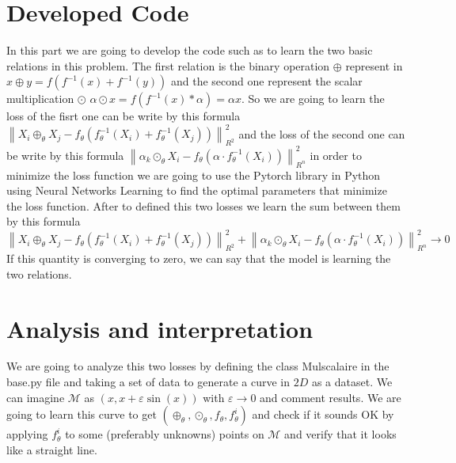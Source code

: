 \documentclass{report}
\begin{document}
        \section{Developed Code }
        In this part we are going to develop the code such as to learn 
        the two basic relations in this problem. The first relation is
        the binary operation $\oplus$ represent in $ x \oplus y = f(f^{-1}(x) + f^{-1}(y)) $  
        and the second one represent the scalar multiplication $\odot$
        $\alpha \odot x = f(f^{-1}(x) * \alpha) = \alpha x$. So we are going 
        to learn the loss of the fisrt one can be write by this formula
        $ \left\|X_i \oplus_\theta X_j-f_\theta\left(f_\theta^{-1}\left(X_i\right)+f_\theta^{-1}\left(X_j\right)\right)\right\|_{R^2}^2 $  
        and the loss of the second one can be write by this formula
        $ \left\|\alpha_k \odot_\theta X_i-f_\theta\left(\alpha \cdot f_\theta^{-1}\left(X_i\right)\right)\right\|_{R^n}^2 $
        in order to minimize the loss function we are going to use the 
        Pytorch library in Python using Neural Networks Learning to find
        the optimal parameters that minimize the loss function.
        After to defined this two losses we learn the sum between them by this
        formula 
        $$
            \left\|X_i \oplus_\theta X_j-f_\theta\left(f_\theta^{-1}\left(X_i\right)+f_\theta^{-1}\left(X_j\right)\right)\right\|_{R^2}^2+\left\|\alpha_k \odot_\theta X_i-f_\theta\left(\alpha \cdot f_\theta^{-1}\left(X_i\right)\right)\right\|_{R^n}^2 \rightarrow 0
        $$ 
        If this quantity is converging to zero, we can say that the model 
        is learning the two relations.\\


        \section{Analysis and interpretation}
        We are going to analyze this two losses by defining the
        class Mulscalaire in the base.py file and taking  a set of data to 
        generate a curve in $2D$ as a dataset. We can imagine $\mathcal{M}$ as
        $(x, x+\varepsilon \sin (x))$ with $\varepsilon \rightarrow 0$ and comment results. We are
        going to learn this curve to get $\left(\oplus_\theta, \odot_\theta, f_\theta, f_\theta^i\right)$
        and check if it sounds OK by applying $f_\theta^i$ 
        to some (preferably unknowns) points on $\mathcal{M}$ 
        and verify that it looks like a straight line.\\
\end{document}

